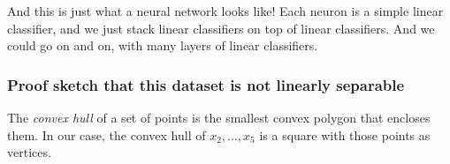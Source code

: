 \documentclass[
]{article}
\begin{document}
And this is just what a neural network looks like! Each neuron is a
simple linear classifier, and we just stack linear classifiers on top of
linear classifiers. And we could go on and on, with many layers of
linear classifiers.

\hypertarget{proof-sketch-that-this-dataset-is-not-linearly-separable}{%
\subsubsection{Proof sketch that this dataset is not linearly
separable}\label{proof-sketch-that-this-dataset-is-not-linearly-separable}}

The \emph{convex hull} of a set of points is the smallest convex polygon
that encloses them. In our case, the convex hull of \(x_2,\ldots,x_5\)
is a square with those points as vertices.
\end{document}
